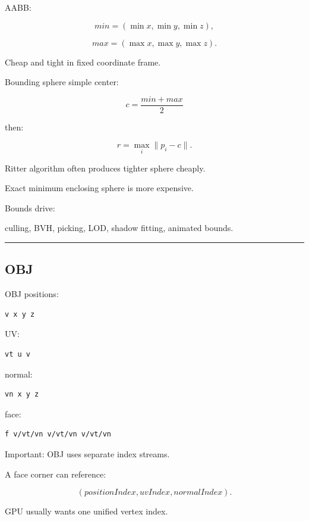 \hypertarget{04-visual-computing-ii-ch041-bounds}{}

AABB:

\[
min=
(\min x,\min y,\min z),
\]

\[
max=
(\max x,\max y,\max z).
\]

Cheap and tight in fixed coordinate frame.

Bounding sphere simple center:

\[
c=
\frac{min+max}{2}
\]

then:

\[
r=
\max_i\|p_i-c\|.
\]

Ritter algorithm often produces tighter sphere cheaply.

Exact minimum enclosing sphere is more expensive.

Bounds drive:

culling, BVH, picking, LOD, shadow fitting, animated bounds.

\begin{center}\rule{0.5\linewidth}{0.5pt}\end{center}

\subsection{OBJ}\label{04-visual-computing-ii-ch041-obj}

\hypertarget{04-visual-computing-ii-ch041-obj}{}

OBJ positions:

\begin{verbatim}
v x y z
\end{verbatim}

UV:

\begin{verbatim}
vt u v
\end{verbatim}

normal:

\begin{verbatim}
vn x y z
\end{verbatim}

face:

\begin{verbatim}
f v/vt/vn v/vt/vn v/vt/vn
\end{verbatim}

Important: OBJ uses separate index streams.

A face corner can reference:

\[
(positionIndex,
uvIndex,
normalIndex).
\]

GPU usually wants one unified vertex index.

